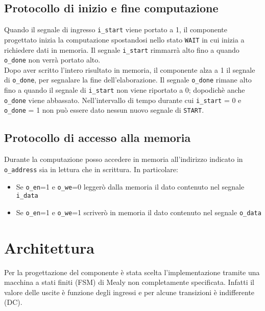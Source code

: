 \documentclass{article}
\begin{document}
\vspace{4mm}
\subsection{Protocollo di inizio e fine computazione}
Quando il segnale di ingresso \verb^i_start^ viene portato a 1, il componente progettato inizia la computazione spostandosi nello stato \verb^WAIT^ in cui inizia a richiedere dati in memoria. Il segnale \verb^i_start^ rimmarrà alto fino a quando \verb^o_done^ non verrà portato alto. 
\\Dopo aver scritto l'intero risultato in memoria, il componente alza a 1 il segnale di \verb^o_done^, per segnalare la fine dell'elaborazione. Il segnale \verb^o_done^ rimane alto fino a quando il segnale di \verb^i_start^ non viene riportato a 0; dopodichè anche \verb^o_done^ viene abbassato. Nell'intervallo di tempo durante cui \verb^i_start^ = 0 e \verb^o_done^ = 1 non può essere dato nessun nuovo segnale di \verb^START^.

\subsection{Protocollo di accesso alla memoria}
Durante la computazione posso accedere in memoria all'indirizzo indicato in \verb^o_address^ sia in lettura che in scrittura. In particolare:
\begin{itemize}
    \item Se \verb^o_en^=1 e \verb^o_we^=0 leggerò dalla memoria il dato contenuto nel segnale \verb^i_data^
    \item Se \verb^o_en^=1 e \verb^o_we^=1 scriverò in memoria il dato contenuto nel segnale \verb^o_data^
\end{itemize}




\newpage





















\pagebreak
\section{Architettura}
Per la progettazione del componente è stata scelta l'implementazione tramite una macchina a stati finiti (FSM) di Mealy non completamente specificata. Infatti il valore delle uscite è funzione degli ingressi e per alcune transizioni è indifferente (DC).
\end{document}
